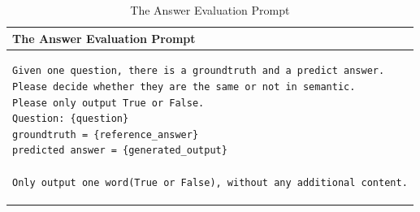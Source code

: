 
\begin{table}[h]
\centering
\begin{tabular}{p{\textwidth}}
\toprule
\textbf{The Answer Evaluation Prompt} \\ 
\midrule
\begin{lstlisting}[basicstyle=\ttfamily\small, frame=single, breaklines=true, breakindent=0pt]
Given one question, there is a groundtruth and a predict answer. 
Please decide whether they are the same or not in semantic. 
Please only output True or False. 
Question: {question}  
groundtruth = {reference_answer}  
predicted answer = {generated_output}

Only output one word(True or False), without any additional content.
\end{lstlisting} \\
\bottomrule
\end{tabular}
\caption{The Answer Evaluation Prompt}
\label{tab:check-ans-prompt}
\end{table}


